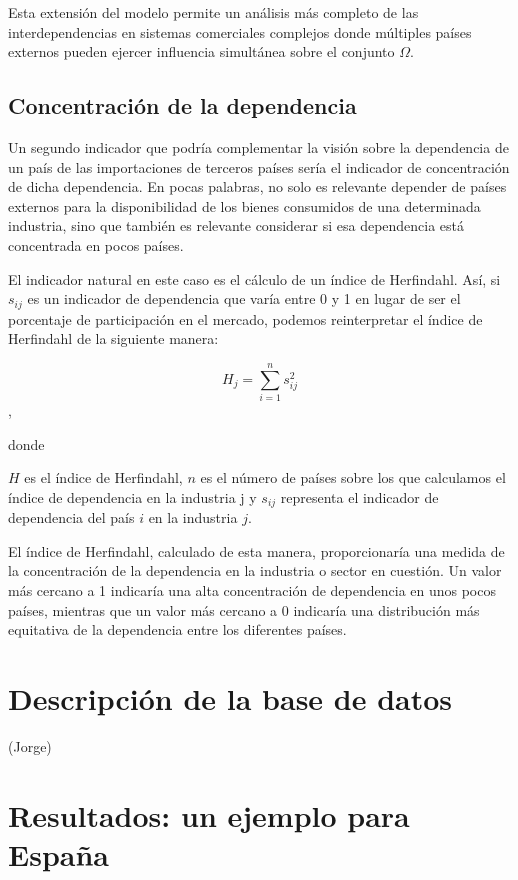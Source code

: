 \documentclass[5p,authoryear]{elsarticle}
\begin{document}
Esta extensión del modelo permite un análisis más completo de las interdependencias en sistemas comerciales complejos donde múltiples países externos pueden ejercer influencia simultánea sobre el conjunto $\Omega$.



\subsection{Concentración de la dependencia}

Un segundo indicador que podría complementar la visión sobre la dependencia de un país de las importaciones de terceros países sería el indicador de concentración de dicha dependencia. En pocas palabras, no solo es relevante depender de países externos para la disponibilidad de los bienes consumidos de una determinada industria, sino que también es relevante considerar si esa dependencia está concentrada en pocos países.

El indicador natural en este caso es el cálculo de un índice de Herfindahl. Así, si $s_{ij}$ es un indicador de dependencia que varía entre 0 y 1 en lugar de ser el porcentaje de participación en el mercado, podemos reinterpretar el índice de Herfindahl de la siguiente manera:


\[ H_j = \sum_{i=1}^{n} s_{ij}^2 \],

donde

$H$ es el índice de Herfindahl, $n$ es el número de países sobre los que calculamos el índice de dependencia en la industria j y $s_{ij}$  representa el indicador de dependencia del país $i$ en la industria $j$.
    
El índice de Herfindahl, calculado de esta manera, proporcionaría una medida de la concentración de la dependencia en la industria o sector en cuestión. Un valor más cercano a 1 indicaría una alta concentración de dependencia en unos pocos países, mientras que un valor más cercano a 0 indicaría una distribución más equitativa de la dependencia entre los diferentes países.


\section{Descripción de la base de datos}
(Jorge)


\section{Resultados: un ejemplo para España}
\end{document}

